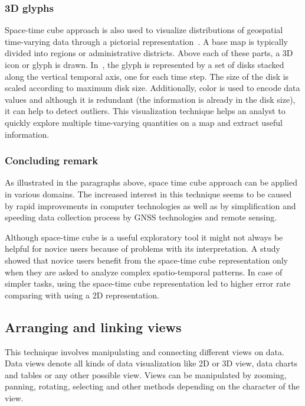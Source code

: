 \documentclass[a4paper,12pt,oneside]{book}
\begin{document}
\subsubsection{3D glyphs}
Space-time cube approach is also used to visualize distributions of
geospatial time-varying data through a pictorial representation~\cite{tominski20053d,thakur20103d}.
A base map is typically divided into regions or administrative districts.
Above each of these parts, a 3D icon or glyph is drawn.
In~\cite{thakur20103d}, the glyph is represented by a set of disks stacked along the vertical temporal axis,
one for each time step. The size of the disk is scaled according to maximum disk size.
Additionally, color is used to encode data values and although it is redundant
(the information is already in the disk size), it can help to detect outliers.
This visualization technique helps an analyst to quickly explore multiple time-varying
quantities on a map and extract useful information.



\subsubsection{Concluding remark}
As illustrated in the paragraphs above, space time cube approach
can be applied in various domains. The increased interest in this technique seems
to be caused by rapid improvements in computer technologies as well as by simplification and speeding
data collection process by GNSS technologies and remote sensing.

Although space-time cube is a useful exploratory tool it might not always be helpful
for novice users because of problems with its interpretation. A study~\cite{kristensson2009evaluation}
showed that novice users benefit from the space-time cube representation only when they are asked to analyze
complex spatio-temporal patterns. In case of simpler tasks, using the space-time cube representation
led to higher error rate comparing with using a 2D representation.




\subsection{Arranging and linking views}
This technique involves manipulating and connecting different views on data.
Data views denote all kinds of data visualization like 2D or 3D view, data charts and tables or any other
possible view.
Views can be manipulated by zooming, panning, rotating, selecting and other methods
depending on the character of the view.
\end{document}
